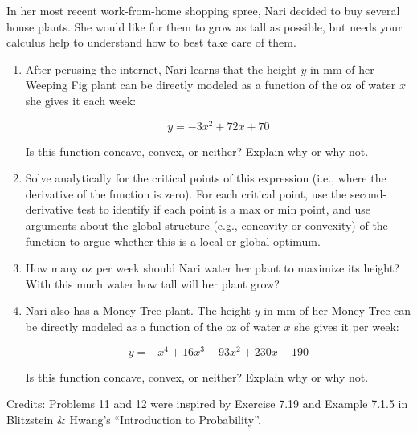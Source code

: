 \documentclass{harvardml}
\theoremstyle{definition}
\theoremstyle{plain}
\begin{document}
\begin{problem}
In her most recent work-from-home shopping spree, Nari decided to buy several house plants.  She would like for them to grow as tall as possible, but needs your calculus help to understand how to best take care of them.

\begin{enumerate} [label=(\alph*)] 
\item After perusing the internet, Nari learns that the height $y$ in mm of her Weeping Fig plant can be directly modeled as a function of the oz of water $x$ she gives it each week:

$$ y = - 3x^2 + 72x + 70$$

Is this function concave, convex, or neither?  Explain why or why not.

\item Solve analytically for the critical points of this expression (i.e., where the derivative of the function is zero).  For each critical point, use the second-derivative test to identify if each point is a  max or min point, and use arguments about the global structure (e.g., concavity or convexity) of the function to argue whether this is a local or global optimum. 

\item How many oz per week should Nari water her plant to maximize its height? With this much water how tall will her plant grow?

\item Nari also has a Money Tree plant.  The height $y$ in mm of her Money Tree can be directly modeled as a function of the oz of water $x$ she gives it per week:

$$ y = - x^4 + 16 x^3 - 93 x^2 + 230 x - 190$$

Is this function concave, convex, or neither?  Explain why or why not.

\end{enumerate}


\end{problem}

\noindent Credits:  Problems 11 and 12 were inspired by Exercise 7.19 and  Example 7.1.5 in Blitzstein \& Hwang's ``Introduction to Probability''.
\end{document}
